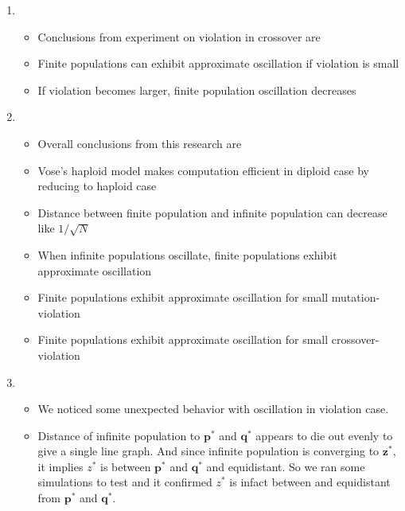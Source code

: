 \documentclass{article}
\begin{document}
\begin{enumerate}
\begin{itemize}
  \end{itemize}  

  
\item
  \begin{itemize}
  \item Conclusions from experiment on violation in crossover are 
  \item Finite populations can exhibit approximate oscillation if violation is small
  \item If violation becomes larger, finite population oscillation decreases
  \end{itemize}
  
\item
  \begin{itemize}
  \item Overall conclusions from this research are
  \item Vose's haploid model makes computation efficient in diploid case by reducing to haploid case 
  \item Distance between finite population and infinite population can decrease like $1/\sqrt{N}$
  \item When infinite populations oscillate, finite populations exhibit approximate oscillation
  \item Finite populations exhibit approximate oscillation for small mutation-violation
  \item Finite populations exhibit approximate oscillation for small crossover-violation        
  \end{itemize}
  
\item
  \begin{itemize}
  \item We noticed some unexpected behavior with oscillation in violation case. 
  \item Distance of infinite population to $\bm{p}^\ast$ and $\bm{q}^\ast$ appears to die out evenly to give a single line graph. And since infinite population is converging to $\bm{z}^\ast$, it implies $z^\ast$ is between $\bm{p}^\ast$ and $\bm{q}^\ast$ and equidistant. So we ran some simulations to test and it confirmed $z^\ast$ is infact between and equidistant from $\bm{p}^\ast$ and $\bm{q}^\ast$.
  \end{itemize}
  

\end{enumerate}
\end{document}
